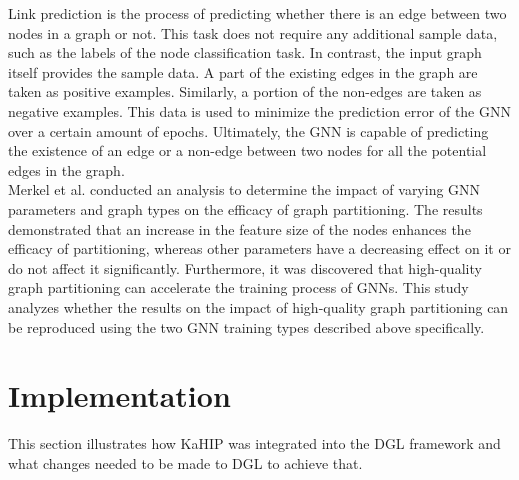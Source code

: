 \documentclass[acmsmall,nonacm,screen,review]{acmart}
\begin{document}
Link prediction is the process of predicting whether there is an edge between two nodes in a graph or not. This task does not require any additional sample data, such as the labels of the node classification task. In contrast, the input graph itself provides the sample data. A part of the existing edges in the graph are taken as positive examples. Similarly, a portion of the non-edges are taken as negative examples. This data is used to minimize the prediction error of the GNN over a certain amount of epochs. Ultimately, the GNN is capable of predicting the existence of an edge or a non-edge between two nodes for all the potential edges in the graph.\\
Merkel et al. \cite{Other} conducted an analysis to determine the impact of varying GNN parameters and graph types on the efficacy of graph partitioning. The results demonstrated that an increase in the feature size of the nodes enhances the efficacy of partitioning, whereas other parameters have a decreasing effect on it or do not affect it significantly. Furthermore, it was discovered that high-quality graph partitioning can accelerate the training process of GNNs. This study analyzes whether the results on the impact of high-quality graph partitioning can be reproduced using the two GNN training types described above specifically.
\section{Implementation}
This section illustrates how KaHIP was integrated into the DGL framework and what changes needed to be made to DGL to achieve that.
\end{document}
